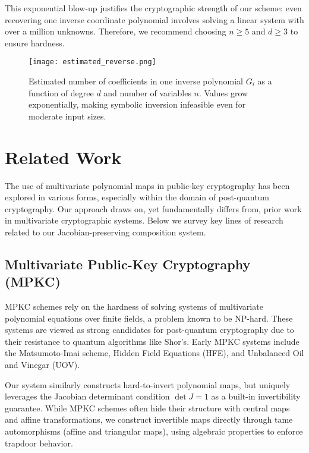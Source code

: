 \documentclass[12pt]{article}
\begin{document}
This exponential blow-up justifies the cryptographic strength of our scheme: even recovering one inverse coordinate polynomial involves solving a linear system with over a million unknowns. Therefore, we recommend choosing \( n \ge 5 \) and \( d \ge 3 \) to ensure hardness.

\begin{figure}[H]
    \centering
    \texttt{[image: estimated\_reverse.png]}
    \caption{Estimated number of coefficients in one inverse polynomial \( G_i \) as a function of degree \( d \) and number of variables \( n \). Values grow exponentially, making symbolic inversion infeasible even for moderate input sizes.}
    \label{fig:inverse-growth}
\end{figure}


\section{Related Work}

The use of multivariate polynomial maps in public-key cryptography has been explored in various forms, especially within the domain of post-quantum cryptography. Our approach draws on, yet fundamentally differs from, prior work in multivariate cryptographic systems. Below we survey key lines of research related to our Jacobian-preserving composition system.

\subsection*{Multivariate Public-Key Cryptography (MPKC)}

MPKC schemes rely on the hardness of solving systems of multivariate polynomial equations over finite fields, a problem known to be NP-hard. These systems are viewed as strong candidates for post-quantum cryptography due to their resistance to quantum algorithms like Shor’s. Early MPKC systems include the Matsumoto-Imai scheme, Hidden Field Equations (HFE), and Unbalanced Oil and Vinegar (UOV).

Our system similarly constructs hard-to-invert polynomial maps, but uniquely leverages the Jacobian determinant condition \( \det J = 1 \) as a built-in invertibility guarantee. While MPKC schemes often hide their structure with central maps and affine transformations, we construct invertible maps directly through tame automorphisms (affine and triangular maps), using algebraic properties to enforce trapdoor behavior.
\end{document}
